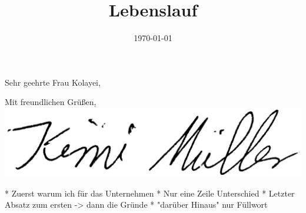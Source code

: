 \documentclass[11pt,a4paper,sans]{moderncv}        %
\title{Lebenslauf}                               %
\begin{document}
\date{\today}
\subject{{\color{purple} Bewerbung um ein Duales Studium der Wirtschaftsinformatik}}
\opening{Sehr geehrte Frau Kolayei,}
\closing{Mit freundlichen Grüßen, \\ \includegraphics[scale=0.09]{images/Unterschrift2}}
\makelettertitle

* Zuerst warum ich für das Unternehmen
* Nur eine Zeile Unterschied
* Letzter Absatz zum ersten -> dann die Gründe
* "darüber Hinaus" nur Füllwort
\end{document}
